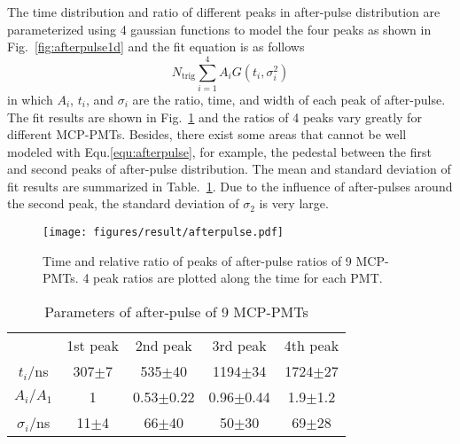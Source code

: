 The time distribution and ratio of different peaks in after-pulse distribution are parameterized using 4 gaussian functions to model the four peaks as shown in Fig.~\ref{fig:afterpulse1d} and the fit equation is as follows
\begin{equation}
    \label{equ:afterpulse}
    N_{\mathrm{trig}}\sum_{i=1}^{4}{A_iG(t_i,\sigma_i^2)}
\end{equation}
in which $A_i$, $t_i$, and $\sigma_i$ are the ratio, time, and width of each peak of after-pulse. The fit results are shown in Fig.~\ref{fig:afterpulsePeak} and the ratios of 4 peaks vary greatly for different MCP-PMTs. Besides, there exist some areas that cannot be well modeled with Equ.\eqref{equ:afterpulse}, for example, the pedestal between the first and second peaks of after-pulse distribution. The mean and standard deviation of fit results are summarized in Table.~\ref{tab:afterpulse}. Due to the influence of after-pulses around the second peak, the standard deviation of $\sigma_2$ is very large.
\begin{figure}[!htbp]
    \centering
    \texttt{[image: figures/result/afterpulse.pdf]}
    \caption{Time and relative ratio of peaks of after-pulse ratios of 9 MCP-PMTs. 4 peak ratios are plotted along the time for each PMT.}
    \label{fig:afterpulsePeak}
\end{figure}
\begin{table}
    \centering
    \caption{Parameters of after-pulse of 9 MCP-PMTs}
    \label{tab:afterpulse}
    \begin{tabular}{c|c|c|c|c}
        \hline
        &1st peak&2nd peak&3rd peak&4th peak\\
        $t_i$/ns&307$\pm$7&535$\pm$40&1194$\pm$34&1724$\pm$27\\
        $A_i/A_1$&1&0.53$\pm$0.22&0.96$\pm$0.44&1.9$\pm$1.2\\
        $\sigma_i$/ns&11$\pm$4&66$\pm$40&50$\pm$30&69$\pm$28\\
        \hline
    \end{tabular}
\end{table}


